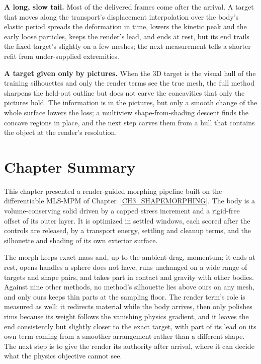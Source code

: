 \textbf{A long, slow tail.} Most of the delivered frames come after the arrival. A target that moves along the transport's
displacement interpolation over the body's elastic period spreads the deformation in time, lowers the kinetic peak and the
early loose particles, keeps the render's lead, and ends at rest, but its end trails the fixed target's slightly on a few
meshes; the next measurement tells a shorter refit from under-supplied extremities.

\textbf{A target given only by pictures.} When the 3D target is the visual hull of the training silhouettes and only the
render terms see the true mesh, the full method sharpens the held-out outline but does not carve the concavities that only
the pictures hold. The information is in the pictures, but only a smooth change of the whole surface lowers the loss; a
multiview shape-from-shading descent finds the concave regions in place, and the next step carves them from a hull that
contains the object at the render's resolution.

\section{Chapter Summary}
\label{ch4:sec_summary}

This chapter presented a render-guided morphing pipeline built on the differentiable MLS-MPM of
Chapter~\ref{CH3_SHAPEMORPHING}. The body is a volume-conserving solid driven by a capped stress increment and a rigid-free
offset of its outer layer. It is optimized in settled windows, each scored after the controls are released, by a
transport energy, settling and cleanup terms, and the silhouette and shading of its own exterior surface.

The morph keeps exact mass and, up to the ambient drag, momentum; it ends at rest, opens handles a sphere does not have,
runs unchanged on a wide range of targets and shape pairs, and takes part in contact and gravity with other bodies. Against
nine other methods, no method's silhouette lies above ours on any mesh, and only ours keeps thin parts at the sampling
floor. The render term's role is measured as well: it redirects material while the body arrives, then only polishes rims
because its weight follows the vanishing physics gradient, and it leaves the end consistently but slightly closer to the
exact target, with part of its lead on its own term coming from a smoother arrangement rather than a different shape. The
next step is to give the render its authority after arrival, where it can decide what the physics objective cannot see.

\setlength{\emergencystretch}{0pt}
